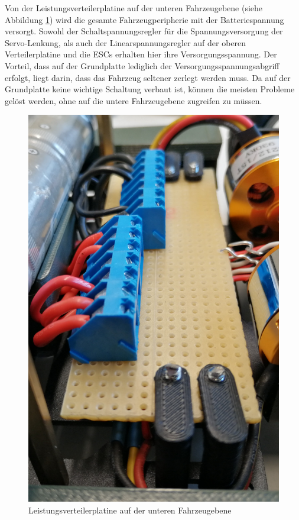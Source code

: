 \begin{minipage}[t]{0.47\textwidth}
Von der Leistungsverteilerplatine auf der unteren Fahrzeugebene (siehe Abbildung \ref{fig:Leistungsverteilerplatine}) wird die gesamte Fahrzeugperipherie mit der Batteriespannung versorgt. Sowohl der Schaltspannungsregler für die Spannungsversorgung der Servo-Lenkung, als auch der Linearspannungsregler auf der oberen Verteilerplatine und die \acp{ESC} erhalten hier ihre Versorgungsspannung. Der Vorteil, dass auf der Grundplatte lediglich der Versorgungsspannungsabgriff erfolgt, liegt darin, dass das Fahrzeug seltener zerlegt werden muss. Da auf der Grundplatte keine wichtige Schaltung verbaut ist, können die meisten Probleme gelöst werden, ohne auf die untere Fahrzeugebene zugreifen zu müssen.
\end{minipage}
\begin{minipage}[t]{0.47\textwidth}
\vspace{-7mm}
\begin{figure}[H] %
\includegraphics[width=.7\textwidth]{sec8/images/Leistungsverteilerplatine} 
\centering
\captionsetup{width=.9\textwidth}
\caption[Leistungsverteilerplatine auf der unteren Fahrzeugebene]{Leistungsverteilerplatine auf der unteren Fahrzeugebene}
\centering
\label{fig:Leistungsverteilerplatine}
\end{figure}
\end{minipage}


